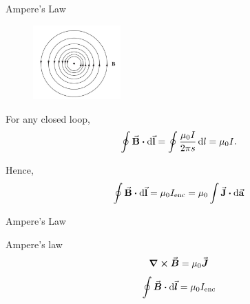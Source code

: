 \documentclass{beamer}
\begin{document}
\begin{frame}{Ampere's Law}
    \begin{figure}[htbp]
        \centering
        \includegraphics[width=0.3\textwidth]{Images/amp.jpg}
    \end{figure}
    For any closed loop,
    \begin{equation}
        \oint \va{B} \vdot \dd{\va{l}} = \oint \frac{\mu_0 I}{2 \pi s} \dd{l} = \mu_0 I.
    \end{equation}

    Hence,
    \begin{equation}
        \oint \va{B} \vdot \dd{\va{l}} = \mu_0 I_{\text{enc}} = \mu_0 \int \va{J} \vdot \dd{\va{a}}
    \end{equation}
\end{frame}


\begin{frame}{Ampere's Law}
    \begin{block}{Ampere's law}
        \begin{equation}
            \curl{\va*{B}} = \mu_0 \va*{J}
        \end{equation}
        \begin{equation}
            \oint \va*{B} \vdot \dd{\va*{l}} = \mu_0 I_{\text{enc}} 
        \end{equation}
    \end{block}
\end{frame}
\end{document}
